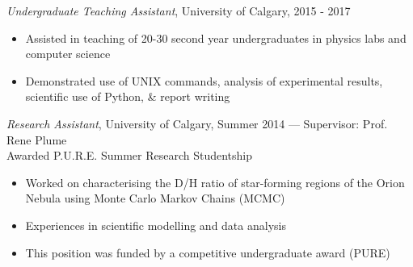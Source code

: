 \documentclass[letter, margin, 10pt]{res} %
\newcommand{\mycomment}[1]{}
\begin{document}
\begin{resume}
{\sl Undergraduate Teaching Assistant}, University of Calgary, 2015 - 2017
\begin{itemize}[noitemsep,topsep=0pt,parsep=0pt,partopsep=0pt]
\item Assisted in teaching of 20-30 second year undergraduates in physics labs and computer science 
\item Demonstrated use of UNIX commands, analysis of experimental results, scientific use of Python, \& report writing
\end{itemize}
\vspace{-10pt}
{\sl Research Assistant}, University of Calgary, Summer 2014 --- Supervisor: Prof. Rene Plume\\
\null\quad\quad Awarded P.U.R.E. Summer Research Studentship
\begin{itemize}[noitemsep,topsep=0pt,parsep=0pt,partopsep=0pt]
\item Worked on characterising the D/H ratio of star-forming regions of the Orion Nebula using Monte Carlo Markov Chains (MCMC)
\item Experiences in scientific modelling and data analysis
\item This position was funded by a competitive undergraduate award (PURE)
\end{itemize}

\mycomment{
\section{OTHER EXPERIENCE}

{\sl Student Rocketry}, 2016--2018
\begin{itemize}[noitemsep,topsep=0pt,parsep=0pt,partopsep=0pt]
\item Member of the Student Organisation for Aerospace Research (SOAR) from 2016-2018
\item Built and tested flight control hardware and software for small sounding rockets using the Arduino platform
\item Experiences in I2C, electronics design and programming (C++)
\end{itemize}
}
\vspace{-9pt}

\end{resume}
\end{document}
